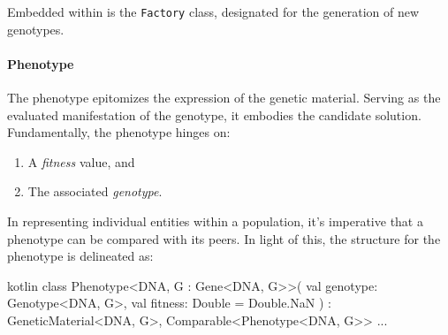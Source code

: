     Embedded within is the \texttt{Factory} class, designated for the 
    generation of new genotypes.

  \paragraph{Phenotype}
    The phenotype epitomizes the expression of the genetic material.
    Serving as the evaluated manifestation of the genotype, it embodies the 
    candidate solution.
    Fundamentally, the phenotype hinges on:
    \begin{enumerate}
        \item A \textit{fitness} value, and
        \item The associated \textit{genotype}.
    \end{enumerate}
    
    In representing individual entities within a population, it's imperative 
    that a phenotype can be compared with its peers. 
    In light of this, the structure for the phenotype is delineated as:
    
    \begin{code}{kotlin}
      class Phenotype<DNA, G : Gene<DNA, G>>(
          val genotype: Genotype<DNA, G>,
          val fitness: Double = Double.NaN
      ) : GeneticMaterial<DNA, G>, Comparable<Phenotype<DNA, G>> { ... }
    \end{code}